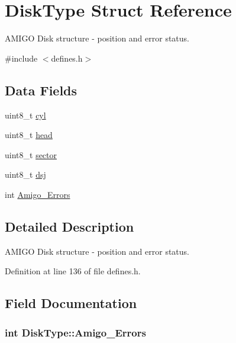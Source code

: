 \hypertarget{structDiskType}{}\section{Disk\+Type Struct Reference}
\label{structDiskType}


A\+M\+I\+GO Disk structure -\/ position and error status.  




{\ttfamily \#include $<$defines.\+h$>$}

\subsection*{Data Fields}
\begin{DoxyCompactItemize}
\item 
uint8\+\_\+t \hyperlink{structDiskType_a990d2a05bc2d8bf1328d0249202539e5}{cyl}
\item 
uint8\+\_\+t \hyperlink{structDiskType_ac4cc3cfd8e1fd4d6ec9dded35384786f}{head}
\item 
uint8\+\_\+t \hyperlink{structDiskType_a6f0a12d4184ccb30a7a5e6e6e713ca85}{sector}
\item 
uint8\+\_\+t \hyperlink{structDiskType_ad89ac2f4b87d861ae4ca3f185868b7da}{dsj}
\item 
int \hyperlink{structDiskType_acb6dbb1b64bfe620430bd235de22292b}{Amigo\+\_\+\+Errors}
\end{DoxyCompactItemize}


\subsection{Detailed Description}
A\+M\+I\+GO Disk structure -\/ position and error status. 

Definition at line 136 of file defines.\+h.



\subsection{Field Documentation}
\subsubsection[{\texorpdfstring{Amigo\+\_\+\+Errors}{Amigo_Errors}}]{\setlength{\rightskip}{0pt plus 5cm}int Disk\+Type\+::\+Amigo\+\_\+\+Errors}\hypertarget{structDiskType_acb6dbb1b64bfe620430bd235de22292b}{}\label{structDiskType_acb6dbb1b64bfe620430bd235de22292b}


